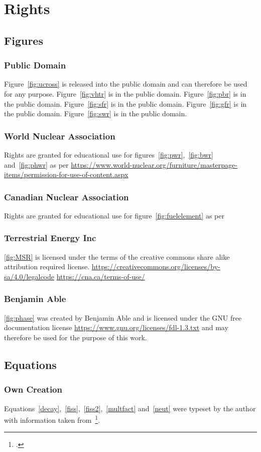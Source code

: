 \chapter{Rights}
\section{Figures}
\subsection{Public Domain}
Figure~\ref{fig:ucross} is released into the public domain and can therefore be used for any purpose.
Figure~\ref{fig:vhtr} is in the public domain.
Figure~\ref{fig:pbr} is in the public domain.
Figure~\ref{fig:sfr} is in the public domain.
Figure~\ref{fig:gfr} is in the public domain.
Figure~\ref{fig:swr} is in the public domain.
\subsection{World Nuclear Association}
Rights are granted for educational use for figures~\ref{fig:pwr},~\ref{fig:bwr} and~\ref{fig:phwr}
as per \url{https://www.world-nuclear.org/furniture/masterpage-items/permission-for-use-of-content.aspx}
\subsection{Canadian Nuclear Association}
Rights are granted for educational use for figure~\ref{fig:fuelelement} as per
\subsection{Terrestrial Energy Inc}
\ref{fig:MSR} is licensed under the terms of the creative commons share alike attribution required
license. \url{https://creativecommons.org/licenses/by-sa/4.0/legalcode}
\url{https://cna.ca/terms-of-use/}
\subsection{Benjamin Able}
\ref{fig:phase} was created by Benjamin Able and is licensed under the GNU free documentation license
\url{https://www.gnu.org/licenses/fdl-1.3.txt} and may therefore be used for the purpose of this
work.
\section{Equations}
\subsection{Own Creation}
Equations~\ref{decay},~\ref{fiss},~\ref{fiss2},~\ref{multfact} and~\ref{neut} were typeset by the author with
information taken from~\footcite{ReactorDesign}.

